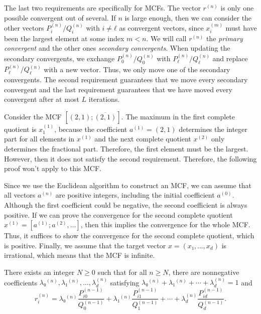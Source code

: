 The last two requirements are specifically for MCFs.
The vector $r^{(n)}$ is only one possible convergent out of several.
If $n$ is large enough, then we can consider the other vectors
$P_i^{(n)}/Q_i^{(n)}$ with $i ≠ ℓ$ as convergent vectors,
since $x_i^{(m)}$ must have been the largest element at some index $m < n$.
We will call $r^{(n)}$ the \emph{primary convergent} and the other ones
\emph{secondary convergents}.
When updating the secondary convergents,
we exchange $P_0^{(n)} / Q_0^{(n)}$ with $P_ℓ^{(n)}/Q_ℓ^{(n)}$
and replace  $P_ℓ^{(n)}/Q_ℓ^{(n)}$ with a new vector.
Thus, we only move one of the secondary convergents.
The second requirement guarantees that we move every secondary convergent
and the last requirement guarantees that we have moved every convergent after at most $L$ iterations.

\begin{example}
  Consider the MCF $[(2, 1); \overline{(2, 1)}]$.
  The maximum in the first complete quotient is $x^{(1)}_1$,
  because the coefficient $a^{(1)} = (2, 1)$ determines the integer part
  for all elements in $x^{(1)}$ and the next complete quotient $x^{(2)}$
  only determines the fractional part.
  Therefore, the first element must be the largest.
  However, then it does not satisfy the second requirement.
  Therefore, the following proof won't apply to this MCF.
\end{example}

Since we use the Euclidean algorithm to construct an MCF,
we can assume that all vectors $a^{(n)}$ are positive integers,
including the initial coefficient $a^{(0)}$.
Although the first coefficient could be negative,
the second coefficient is always positive.
If we can prove the convergence for the second complete quotient $x^{(1)} = [a^{(1)}; a^{(2)}, …]$,
then this implies the convergence for the whole MCF.
Thus, it suffices to show the convergence for the second complete quotient,
which is positive.
Finally, we assume that the target vector $x = (x₁, …, x_d)$ is irrational,
which means that the MCF is infinite.

\begin{lemma}
  \label{lem:conv-conv}
  There exists an integer $N ≥ 0$ such that for all $n ≥ N$,
  there are nonnegative coefficients $λ₀^{(n)}, λ₁^{(n)}, …, λ_d^{(n)}$
  satisfying $λ₀^{(n)} + λ₁^{(n)} + ⋯ + λ_d^{(n)} = 1$ and
  \[
    r_i^{(n)} = λ₀^{(n)} \frac{P_{i0}^{(n-1)}}{Q_0^{(n-1)}} + λ₁^{(n)} \frac{P_{i1}^{(n-1)}}{Q_1^{(n-1)}} + ⋯ + λ_d^{(n)} \frac{P_{id}^{(n-1)}}{Q_d^{(n-1)}}.
  \]
\end{lemma}

